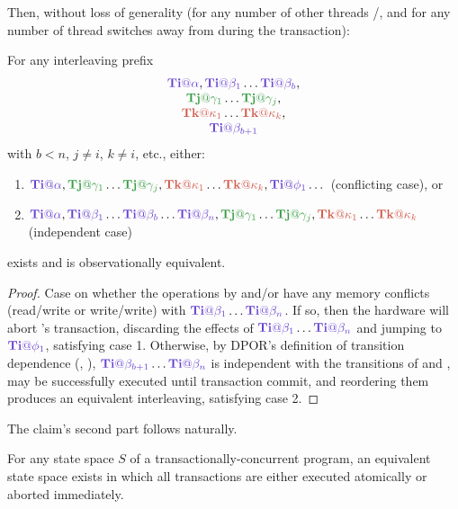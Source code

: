 Then, without loss of generality (for any number of other threads \tjj/\tkk, and for any number of thread switches away from \tii during the transaction):
\vspace{1em}

\begin{lemma}
	\label{lem:equiv}
	For any interleaving prefix
	\[
	\begin{tabular}{c}
		$\tiiat{\alpha},\tiiat{\beta_1}\dots\tiiat{\beta_b},$\\
		$\tjjat{\gamma_1}\dots\tjjat{\gamma_j},$ \\
		$\tkkat{\kappa_1}\dots\tkkat{\kappa_k},$ \\
		$\tiiat{\beta_{b+1}}$ %
	\end{tabular}
	\]
	with $b<n$, $j \ne i$, $k \ne i$, etc., either:
	\begin{enumerate}
		\item $\tiiat{\alpha},\tjjat{\gamma_1}\dots\tjjat{\gamma_j},\tkkat{\kappa_1}\dots\tkkat{\kappa_k},\tiiat{\phi_1}\dots$
			(conflicting case), or
		\item $\tiiat{\alpha},\tiiat{\beta_1}\dots\tiiat{\beta_b}\dots\tiiat{\beta_n},\tjjat{\gamma_1}\dots\tjjat{\gamma_j},\tkkat{\kappa_1}\dots\tkkat{\kappa_k}$
			(independent case)
	\end{enumerate}
	exists and is observationally equivalent.
\end{lemma}

\begin{proof}
	Case on whether the operations by \tjj and/or \tkk have any memory conflicts (read/\allowbreak{}write or write/write)
	with $\tiiat{\beta_1}\dots\tiiat{\beta_n}$.
	If so, then the hardware will abort \tii's transaction, discarding the effects of $\tiiat{\beta_1}\dots\tiiat{\beta_n}$
	and jumping to $\tiiat{\phi_1}$,
	satisfying case 1.
	Otherwise, by DPOR's definition of transition dependence (\cite{dpor}, \sect{\ref{sec:landslide-dpor-hb}}),
	$\tiiat{\beta_{b+1}}\dots\tiiat{\beta_n}$ is independent with the transitions of \tjj and \tkk,
	may be successfully executed until transaction commit,
	and reordering them produces an equivalent interleaving,
	satisfying case 2.
\end{proof}

The claim's second part follows naturally.
\vspace{1em}

\begin{theorem}
	\label{thm:atom}
	For any state space $S$ of a transactionally-concurrent program,
	an equivalent state space exists in which all transactions are either executed atomically or aborted immediately.
\end{theorem}

